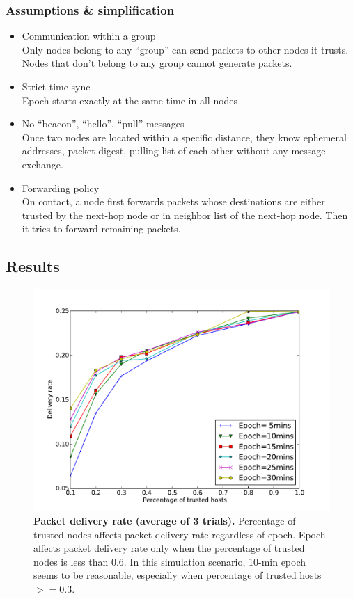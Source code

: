 \documentclass[11pt]{article}
\begin{document}
\subsubsection{Assumptions \& simplification}
\begin{itemize}
 \item Communication within a group\\
Only nodes belong to any ``group'' can send packets to other nodes it trusts. 
Nodes that don't belong to any group cannot generate packets.

 \item Strict time sync\\
Epoch starts exactly at the same time in all nodes

 \item No ``beacon'', ``hello'', ``pull'' messages\\
Once two nodes are located within a specific distance, they know ephemeral addresses, packet digest, pulling list of each other without any message exchange. 

 \item Forwarding policy\\
On contact, a node first forwards packets whose destinations are either trusted by the next-hop node or in neighbor list of the next-hop node.  Then it tries to forward remaining packets. 
\end{itemize}


\subsection{Results}

\begin{figure}[h!]
\center
\includegraphics[width=0.6\columnwidth]{figures/delivery_rate.pdf}
\caption{{\bf Packet delivery rate (average of 3 trials).}
Percentage of trusted nodes affects packet delivery rate regardless of epoch. 
Epoch affects packet delivery rate only when the percentage of trusted nodes is less than $0.6$. 
In this simulation scenario, 10-min epoch seems to be reasonable, especially when percentage of trusted hosts $>= 0.3$.}
\label{fig:delivery_rate}
\end{figure}
\end{document}

